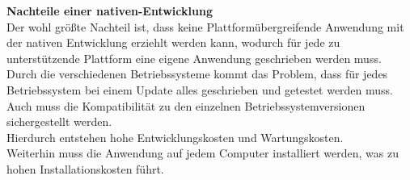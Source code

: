 \documentclass[ngerman]{article}
\begin{document}
    \textbf{Nachteile einer nativen-Entwicklung}\\
    Der wohl größte Nachteil ist, dass keine Plattformübergreifende Anwendung mit der nativen Entwicklung erziehlt werden kann, wodurch für jede zu unterstützende Plattform eine eigene Anwendung geschrieben werden muss. \cite{Native Application Development}\\
    Durch die verschiedenen Betriebssysteme kommt das Problem, dass für jedes Betriebssystem bei einem Update alles geschrieben und getestet werden muss. Auch muss die Kompatibilität zu den einzelnen Betriebssystemversionen sichergestellt werden.\cite{NativeDisadvantages}\\
    Hierdurch entstehen hohe Entwicklungskosten und Wartungskosten.\\
    Weiterhin muss die Anwendung auf jedem Computer installiert werden, was zu hohen Installationskosten führt.
\end{document}
